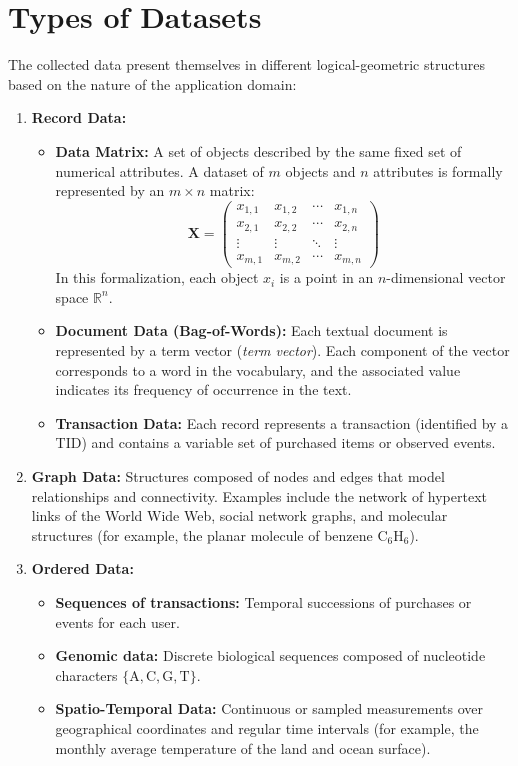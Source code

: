 \section{Types of Datasets}

The collected data present themselves in different logical-geometric structures based on the nature of the application domain:

\begin{enumerate}
    \item \textbf{Record Data:}
    \begin{itemize}
        \item \textbf{Data Matrix:} A set of objects described by the same fixed set of numerical attributes. A dataset of $m$ objects and $n$ attributes is formally represented by an $m \times n$ matrix:
        \begin{equation}
        \mathbf{X} = \begin{pmatrix}
        x_{1,1} & x_{1,2} & \cdots & x_{1,n} \\
        x_{2,1} & x_{2,2} & \cdots & x_{2,n} \\
        \vdots & \vdots & \ddots & \vdots \\
        x_{m,1} & x_{m,2} & \cdots & x_{m,n}
        \end{pmatrix}
        \end{equation}
        In this formalization, each object $x_i$ is a point in an $n$-dimensional vector space $\mathbb{R}^n$.
        \item \textbf{Document Data (Bag-of-Words):} Each textual document is represented by a term vector (\textit{term vector}). Each component of the vector corresponds to a word in the vocabulary, and the associated value indicates its frequency of occurrence in the text.
        \item \textbf{Transaction Data:} Each record represents a transaction (identified by a TID) and contains a variable set of purchased items or observed events.
    \end{itemize}

    \item \textbf{Graph Data:} Structures composed of nodes and edges that model relationships and connectivity. Examples include the network of hypertext links of the World Wide Web, social network graphs, and molecular structures (for example, the planar molecule of benzene $\text{C}_6\text{H}_6$).

    \item \textbf{Ordered Data:}
    \begin{itemize}
        \item \textbf{Sequences of transactions:} Temporal successions of purchases or events for each user.
        \item \textbf{Genomic data:} Discrete biological sequences composed of nucleotide characters $\{\text{A}, \text{C}, \text{G}, \text{T}\}$.
        \item \textbf{Spatio-Temporal Data:} Continuous or sampled measurements over geographical coordinates and regular time intervals (for example, the monthly average temperature of the land and ocean surface).
    \end{itemize}
\end{enumerate}
